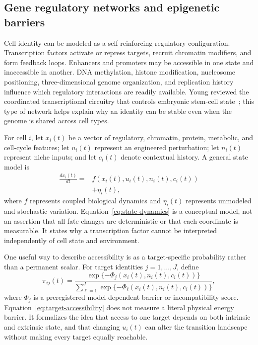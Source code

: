 \documentclass[10pt,conference]{IEEEtran}
\begin{document}
\subsection{Gene regulatory networks and epigenetic barriers}

Cell identity can be modeled as a self-reinforcing regulatory configuration. Transcription factors activate or repress targets, recruit chromatin modifiers, and form feedback loops. Enhancers and promoters may be accessible in one state and inaccessible in another. DNA methylation, histone modification, nucleosome positioning, three-dimensional genome organization, and replication history influence which regulatory interactions are readily available. Young reviewed the coordinated transcriptional circuitry that controls embryonic stem-cell state~\cite{young2011}; this type of network helps explain why an identity can be stable even when the genome is shared across cell types.

For cell $i$, let $x_i(t)$ be a vector of regulatory, chromatin, protein, metabolic, and cell-cycle features; let $u_i(t)$ represent an engineered perturbation; let $n_i(t)$ represent niche inputs; and let $c_i(t)$ denote contextual history. A general state model is
\begin{align}
\frac{d x_i(t)}{dt}={}&f\!\left(x_i(t),u_i(t),n_i(t),c_i(t)\right) \nonumber\\
&+\eta_i(t),
\label{eq:state-dynamics}
\end{align}
where $f$ represents coupled biological dynamics and $\eta_i(t)$ represents unmodeled and stochastic variation. Equation~\eqref{eq:state-dynamics} is a conceptual model, not an assertion that all fate changes are deterministic or that each coordinate is measurable. It states why a transcription factor cannot be interpreted independently of cell state and environment.

One useful way to describe accessibility is as a target-specific probability rather than a permanent scalar. For target identities $j=1,\ldots,J$, define
\begin{equation}
\pi_{ij}(t)=\frac{\exp\{-\Phi_j(x_i(t),n_i(t),c_i(t))\}}{\sum_{\ell=1}^{J}\exp\{-\Phi_\ell(x_i(t),n_i(t),c_i(t))\}},
\label{eq:target-accessibility}
\end{equation}
where $\Phi_j$ is a preregistered model-dependent barrier or incompatibility score. Equation~\eqref{eq:target-accessibility} does not measure a literal physical energy barrier. It formalizes the idea that access to one target depends on both intrinsic and extrinsic state, and that changing $u_i(t)$ can alter the transition landscape without making every target equally reachable.
\end{document}
